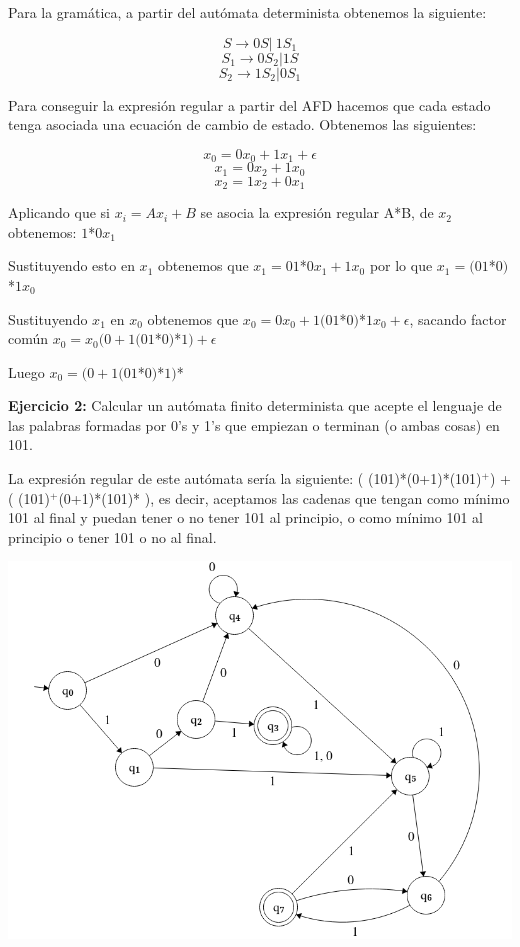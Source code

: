 \documentclass[12pt, spanish]{article}
\begin{document}
Para la gramática, a partir del autómata determinista obtenemos la siguiente:

\begin{center}

	$$S \rightarrow 0S \vert\ 1S_1 $$
	$$S_1 \rightarrow 0S_2 \vert 1S $$
	$$S_2 \rightarrow 1S_2 \vert 0S_1$$

\end{center}

\newpage

Para conseguir la expresión regular a partir del AFD hacemos que cada estado tenga asociada una ecuación de cambio de estado. Obtenemos las siguientes:

$$ x_0 = 0x_0 + 1x_1 + \epsilon $$
$$ x_1 = 0x_2 + 1x_0$$
$$x_2 = 1x_2 + 0x_1$$

Aplicando que si $x_i = Ax_i + B$ se asocia la expresión regular A*B, de $x_2$ obtenemos: $1$*$0x_1$


Sustituyendo esto en $x_1$ obtenemos que $x_1 = 01$*$0x_1 + 1x_0$ por lo que $x_1 = (01$*$0)$*$1x_0$

Sustituyendo $x_1$ en $x_0$ obtenemos que $x_0 = 0x_0 + 1(01$*$0)$*$1x_0 + \epsilon$, sacando factor común $x_0 = x_0(0 + 1(01$*$0)$*$1) + \epsilon$

Luego $x_0 =(0 + 1(01$*$0)$*$1)$*



\textbf{Ejercicio 2:} Calcular  un  autómata  finito  determinista  que  acepte  el  lenguaje  de  las  palabras  formadas por 0’s y 1’s que empiezan o terminan (o ambas cosas) en 101.

La expresión regular de este autómata sería la siguiente: ( (101)*(0+1)*(101)$^+$) +  ( (101)$^+$(0+1)*(101)* ), es decir, aceptamos las cadenas que tengan como mínimo 101 al final y puedan tener o no tener 101 al principio, o como mínimo 101 al principio o tener 101 o no al final.

\begin{center}
	\includegraphics[scale=0.4]{aut2.png}
\end{center}
\end{document}
